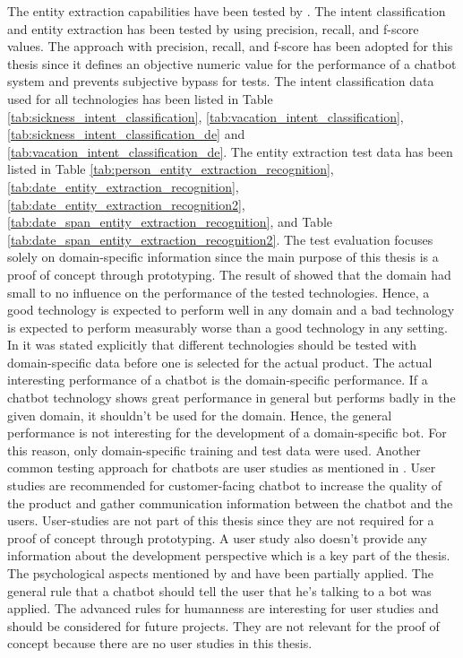 The entity extraction capabilities have been tested by \citet{geyer2016named}.
The intent classification and entity extraction has been tested by \citet{braunEvaluatingNLU} 
using precision, recall, and f-score values.
The approach with precision, recall, and f-score has been adopted for this thesis 
since it defines an objective numeric value for the performance of a chatbot system 
and prevents subjective bypass for tests.
The intent classification data used for all technologies has been listed in 
Table \ref{tab:sickness_intent_classification},
\ref{tab:vacation_intent_classification}, \ref{tab:sickness_intent_classification_de} and \ref{tab:vacation_intent_classification_de}.
The entity extraction test data has been listed in Table \ref{tab:person_entity_extraction_recognition}, 
\ref{tab:date_entity_extraction_recognition}, \ref{tab:date_entity_extraction_recognition2}, 
\ref{tab:date_span_entity_extraction_recognition}, and Table \ref{tab:date_span_entity_extraction_recognition2}.
The test evaluation focuses solely on domain-specific information since the main purpose 
of this thesis is a proof of concept through prototyping.
The result of \citet{braunEvaluatingNLU} showed that the domain had small to no influence on the 
performance of the tested technologies.
Hence, a good technology is expected to perform well in any domain and a bad technology is expected
to perform measurably worse than a good technology in any setting.
In \citet{braunEvaluatingNLU} it was stated explicitly that different technologies should be tested 
with domain-specific data before one is selected for the actual product.
The actual interesting performance of a chatbot is the domain-specific performance.
If a chatbot technology shows great performance in general but performs badly in the 
given domain, it shouldn't be used for the domain.
Hence, the general performance is not interesting for the development of a 
domain-specific bot.
For this reason, only domain-specific training and test data were used.
Another common testing approach for chatbots are user studies as mentioned 
in \citet{evaluateChatbotsShawar2007}.
User studies are recommended for customer-facing chatbot to increase the quality of the 
product and gather communication information between the chatbot and the users.
User-studies are not part of this thesis since they are not required for a proof of concept 
through prototyping.
A user study also doesn't provide any information about the development perspective which is 
a key part of the thesis.
The psychological aspects mentioned by \citet{folstad2017chatbots, brandtzaeg2018chatbots}
and \citet{GO2019304} have been partially applied.
The general rule that a chatbot should tell the user that he's talking to a bot 
was applied.
The advanced rules for humanness are interesting for user studies and should be considered 
for future projects.
They are not relevant for the proof of concept because there are no user studies in this thesis.


